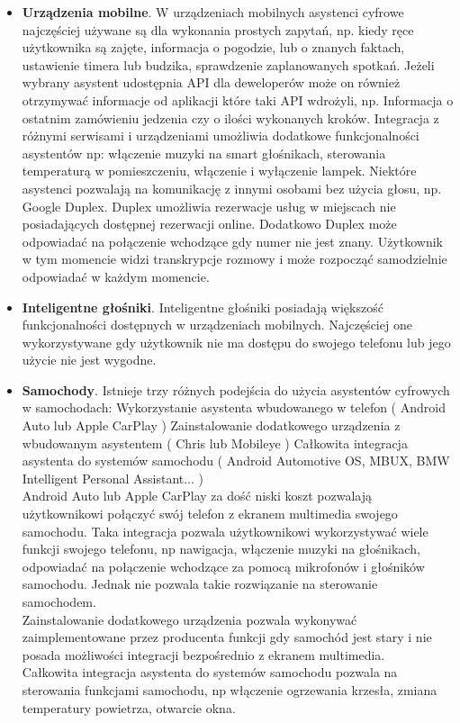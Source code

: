 \begin{itemize}
	\item \textbf{Urządzenia mobilne}. W urządzeniach mobilnych asystenci cyfrowe najczęściej używane są dla wykonania prostych zapytań, np. kiedy ręce użytkownika są zajęte, informacja o pogodzie, lub o znanych faktach, ustawienie timera lub budzika, sprawdzenie zaplanowanych spotkań. Jeżeli wybrany asystent udostępnia API dla deweloperów może on również otrzymywać informacje od aplikacji które taki API wdrożyli, np. Informacja o ostatnim zamówieniu jedzenia czy o ilości wykonanych kroków. Integracja z różnymi serwisami i urządzeniami umożliwia dodatkowe funkcjonalności asystentów np: włączenie muzyki na smart głośnikach, sterowania temperaturą w pomieszczeniu, włączenie i wyłączenie lampek. Niektóre asystenci pozwalają na komunikację z innymi osobami bez użycia głosu, np. Google Duplex. Duplex umożliwia rezerwacje usług w miejscach nie posiadających dostępnej rezerwacji online. Dodatkowo Duplex może odpowiadać na połączenie wchodzące gdy numer nie jest znany. Użytkownik w tym momencie widzi transkrypcje rozmowy i może rozpocząć samodzielnie odpowiadać w każdym momencie. 
	\item \textbf{Inteligentne głośniki}. Inteligentne głośniki posiadają większość funkcjonalności dostępnych w urządzeniach mobilnych. Najczęściej one wykorzystywane gdy użytkownik nie ma dostępu do swojego telefonu lub jego użycie nie jest wygodne. 
	\item \textbf{Samochody}. Istnieje trzy różnych podejścia do użycia asystentów cyfrowych w samochodach: Wykorzystanie asystenta wbudowanego w telefon ( Android Auto lub Apple CarPlay ) Zainstalowanie dodatkowego urządzenia z wbudowanym asystentem ( Chris lub Mobileye ) Całkowita integracja asystenta do systemów samochodu ( Android Automotive OS, MBUX, BMW Intelligent Personal Assistant... ) \\
	
	Android Auto lub Apple CarPlay za dość niski koszt pozwalają użytkownikowi połączyć swój telefon z ekranem multimedia swojego samochodu. Taka integracja pozwala użytkownikowi wykorzystywać wiele funkcji swojego telefonu, np nawigacja, włączenie muzyki na głośnikach, odpowiadać na połączenie wchodzące za pomocą mikrofonów i głośników samochodu. Jednak nie pozwala takie rozwiązanie na sterowanie samochodem. \\
	
	Zainstalowanie dodatkowego urządzenia pozwala wykonywać zaimplementowane przez producenta funkcji gdy samochód jest stary i nie posada możliwości integracji bezpośrednio z ekranem multimedia. \\
	
	Całkowita integracja asystenta do systemów samochodu pozwala na sterowania funkcjami samochodu, np włączenie ogrzewania krzesła, zmiana temperatury powietrza, otwarcie okna. \\
\end{itemize}
	
